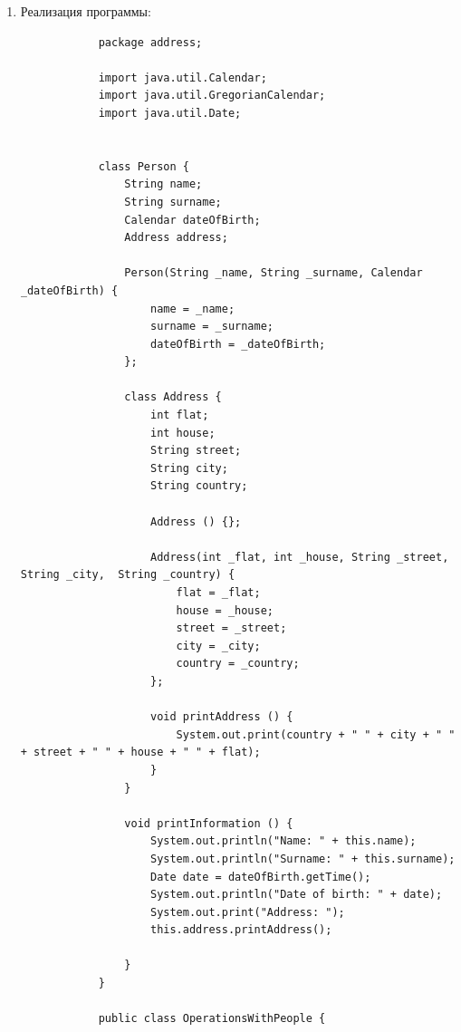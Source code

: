 \documentclass[a4paper]{article}
\begin{document}
    \begin{enumerate}
   
        \item Реализация программы:
        
        \begin{lstlisting}
            package address;

            import java.util.Calendar;
            import java.util.GregorianCalendar;
            import java.util.Date;
            
            
            class Person {
                String name;
                String surname;
                Calendar dateOfBirth;
                Address address;
            
                Person(String _name, String _surname, Calendar _dateOfBirth) {
                    name = _name;
                    surname = _surname;
                    dateOfBirth = _dateOfBirth;
                };
            
                class Address {
                    int flat;
                    int house;
                    String street;
                    String city;
                    String country;
                    
                    Address () {};
            
                    Address(int _flat, int _house, String _street, String _city,  String _country) {
                        flat = _flat;
                        house = _house;
                        street = _street;
                        city = _city;
                        country = _country; 
                    };
            
                    void printAddress () {
                        System.out.print(country + " " + city + " " + street + " " + house + " " + flat);
                    }
                }
            
                void printInformation () {
                    System.out.println("Name: " + this.name);
                    System.out.println("Surname: " + this.surname);
                    Date date = dateOfBirth.getTime();
                    System.out.println("Date of birth: " + date);
                    System.out.print("Address: ");
                    this.address.printAddress();
            
                }
            }
            
            public class OperationsWithPeople {
                

\end{lstlisting}
\end{enumerate}
\end{document}
